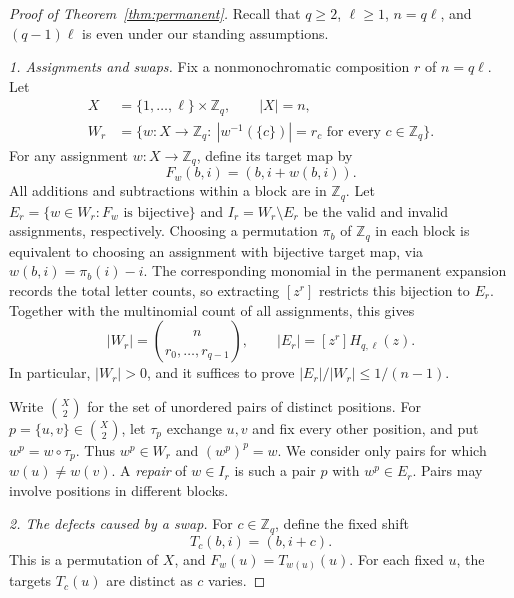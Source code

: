 \documentclass[10pt,a4paper]{amsart}
\newcommand{\Z}{\mathbb Z}
\newcommand{\mult}[2]{\binom{#1}{#2}}
\begin{document}
\begin{proof}[Proof of Theorem~\ref{thm:permanent}]
Recall that \(q\geq2\), \(\ell\geq1\), \(n=q\ell\), and
\((q-1)\ell\) is even under our standing assumptions.

\emph{1. Assignments and swaps.}
Fix a nonmonochromatic composition \(r\) of \(n=q\ell\).
Let
\begin{equation}
 \begin{aligned}
 X&=\{1,\ldots,\ell\}\times\Z_q,\qquad |X|=n,\\
 W_r&=\{w:X\to\Z_q:\ |w^{-1}(\{c\})|=r_c
                    \text{ for every }c\in\Z_q\}.
 \end{aligned}
\end{equation}
For any assignment \(w:X\to\Z_q\), define its target map by
\begin{equation}
 F_w(b,i)=(b,i+w(b,i)).
\end{equation}
All additions and subtractions within a block are in \(\Z_q\).
Let \(E_r=\{w\in W_r:F_w\text{ is bijective}\}\) and
\(I_r=W_r\setminus E_r\) be the valid and invalid assignments,
respectively. Choosing a permutation \(\pi_b\) of \(\Z_q\)
in each block is equivalent to choosing an assignment with bijective
target map, via \(w(b,i)=\pi_b(i)-i\). The corresponding monomial
in the permanent expansion records the total letter counts, so
extracting \([z^r]\) restricts this bijection to \(E_r\).
Together with the multinomial count of all assignments, this gives
\begin{equation}\label{eq:count}
 |W_r|=\mult n{r_0,\ldots,r_{q-1}},\qquad
 |E_r|=[z^r]H_{q,\ell}(z).
\end{equation}
In particular, \(|W_r|>0\), and it suffices to prove
\(|E_r|/|W_r|\leq1/(n-1)\).

Write \(\binom X2\) for the set of unordered pairs of distinct
positions. For \(p=\{u,v\}\in\binom X2\), let \(\tau_p\)
exchange \(u,v\) and fix every other position, and put
\(w^p=w\circ\tau_p\). Thus \(w^p\in W_r\) and
\((w^p)^p=w\). We consider only pairs for which \(w(u)\ne w(v)\).
A \emph{repair} of \(w\in I_r\) is such a pair \(p\) with
\(w^p\in E_r\). Pairs may involve positions in different blocks.

\emph{2. The defects caused by a swap.}
For \(c\in\Z_q\), define the fixed shift
\begin{equation}
 T_c(b,i)=(b,i+c).
\end{equation}
This is a permutation of \(X\), and
\(F_w(u)=T_{w(u)}(u)\). For each fixed \(u\), the targets
\(T_c(u)\) are distinct as \(c\) varies.


\end{proof}
\end{document}
